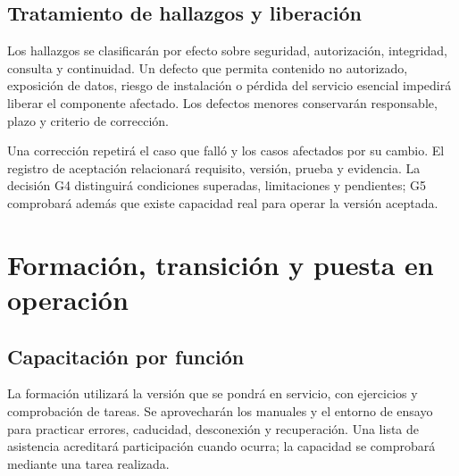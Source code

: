 \subsection{Tratamiento de hallazgos y liberación}
Los hallazgos se clasificarán por efecto sobre seguridad, autorización, integridad, consulta y continuidad. Un defecto que permita contenido no autorizado, exposición de datos, riesgo de instalación o pérdida del servicio esencial impedirá liberar el componente afectado. Los defectos menores conservarán responsable, plazo y criterio de corrección.

Una corrección repetirá el caso que falló y los casos afectados por su cambio. El registro de aceptación relacionará requisito, versión, prueba y evidencia. La decisión G4 distinguirá condiciones superadas, limitaciones y pendientes; G5 comprobará además que existe capacidad real para operar la versión aceptada.

\section{Formación, transición y puesta en operación}
\label{sec:int_transicion}
\subsection{Capacitación por función}
La formación utilizará la versión que se pondrá en servicio, con ejercicios y comprobación de tareas. Se aprovecharán los manuales y el entorno de ensayo para practicar errores, caducidad, desconexión y recuperación. Una lista de asistencia acreditará participación cuando ocurra; la capacidad se comprobará mediante una tarea realizada.


